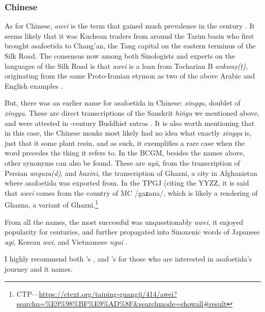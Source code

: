 \subsubsection{Chinese}



As for Chinese,  \textit{awei} is the term that gained much prevalence in the  century \autocite{leung_itinerary_2019}. It seems likely that it was Kuchean traders from around the Tarim basin who first brought asafoetida to Chang'an, the Tang capital on the eastern terminus of the Silk Road. The consensus now among both Sinologists and experts on the languages of the Silk Road is that \textit{awei} is a loan from Tocharian B \textit{ankwaṣ(ṭ)}, originating from the same Proto-Iranian etymon as two of the above Arabic and English examples \autocites[353]{laufer_sino-iranica_1919}[121]{baxter_old_2014}.



But, there was an earlier name for asafoetida in Chinese:  \textit{xingqu}, doublet of  \textit{xingyu}. These are direct transcriptions of the Sanskrit \textit{hiṅgu} we mentioned above, and were attested in -century Buddhist sutras \autocite{leung_itinerary_2019}. It is also worth mentioning that in this case, the Chinese monks most likely had no idea what exactly \textit{xingqu} is, just that it some plant resin, and as such, it exemplifies a rare case when the word precedes the thing it refers to. In the \gls{BCGM}, besides the names above, other synonyms can also be found. These are  \textit{ayü}, from the transcription of Persian \textit{anguza(d)}, and  \textit{haxini}, the transcription of Ghazni, a city in Afghanistan where asafoetida was exported from. In the \gls{TPGJ} (citing the \gls{YYZZ}, it is said that \textit{awei} comes from the country of  \gls{MC} /gaʑana/, which is likely a rendering of Ghazna, a variant of Ghazni.\footnote{\gls{CTP}---\url{https://ctext.org/taiping-guangji/414/awei?searchu=\%E9\%98\%BF\%E9\%AD\%8F&searchmode=showall\#result}}

From all the names, the most successful was unquestionably \textit{awei}, it enjoyed popularity for centuries, and further propagated into Sinoxenic words of Japanese  \textit{agi}, Korean  \textit{awi}, and Vietnamese \textit{ngui} \autocites{leung_itinerary_2019}.

I highly recommend both \textcite[]{laufer_sino-iranica_1919}'s , and \textcite{leung_itinerary_2019}'s  for those who are interested in asafoetida's journey and it names.  

